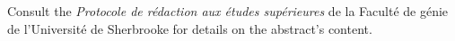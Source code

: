 Consult the \textit{Protocole de rédaction aux études supérieures} de la Faculté de génie de l'Université de Sherbrooke for details on the abstract's content.
